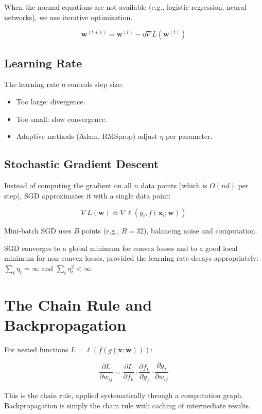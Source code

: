When the normal equations are not available (e.g., logistic regression, neural networks), we use iterative optimization.

\[
	\mathbf{w}^{(t+1)} = \mathbf{w}^{(t)} - \eta \nabla L(\mathbf{w}^{(t)})
\]

\subsection{Learning Rate}

The learning rate $\eta$ controls step size:

\begin{itemize}
	\item Too large: divergence.
	\item Too small: slow convergence.
	\item Adaptive methods (Adam, RMSprop) adjust $\eta$ per parameter.
\end{itemize}

\subsection{Stochastic Gradient Descent}

Instead of computing the gradient on all $n$ data points (which is $O(nd)$ per step), SGD approximates it with a single data point:

\[
	\nabla L(\mathbf{w}) \approx \nabla \ell(y_i, f(\mathbf{x}_i; \mathbf{w}))
\]

Mini-batch SGD uses $B$ points (e.g., $B = 32$), balancing noise and computation.

\begin{principle}
	SGD converges to a global minimum for convex losses and to a good local minimum for non-convex losses, provided the learning rate decays appropriately: $\sum_t \eta_t = \infty$ and $\sum_t \eta_t^2 < \infty$.
\end{principle}

\section{The Chain Rule and Backpropagation}

For nested functions $L = \ell(f(g(\mathbf{x}; \mathbf{w})))$:

\[
	\frac{\partial L}{\partial w_{ij}} = \frac{\partial L}{\partial f_k} \cdot \frac{\partial f_k}{\partial g_j} \cdot \frac{\partial g_j}{\partial w_{ij}}
\]

This is the chain rule, applied systematically through a computation graph. Backpropagation is simply the chain rule with caching of intermediate results.

